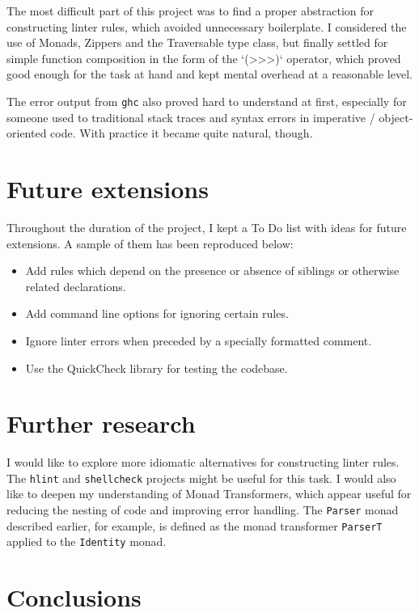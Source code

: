 \documentclass[]{article}
\providecommand{\tightlist}{%
  \setlength{\itemsep}{0pt}\setlength{\parskip}{0pt}}
\begin{document}
The most difficult part of this project was to find a proper abstraction
for constructing linter rules, which avoided unnecessary boilerplate. I
considered the use of Monads, Zippers and the Traversable type
class, but finally settled for simple function composition in the form
of the `(>>>)` operator, which proved good enough for the task
at hand and kept mental overhead at a reasonable level.

The error output from \texttt{ghc} also proved hard to understand at
first, especially for someone used to traditional stack traces and
syntax errors in imperative / object-oriented code. With practice it
became quite natural, though.

\section{Future extensions}\label{future-extensions}

Throughout the duration of the project, I kept a To Do list with ideas
for future extensions. A sample of them has been reproduced below:

\begin{itemize}
\tightlist
\item
  Add rules which depend on the presence or absence of siblings or
  otherwise related declarations.
\item
  Add command line options for ignoring certain rules.
\item
  Ignore linter errors when preceded by a specially formatted comment.
\item
  Use the QuickCheck library for testing the codebase.
\end{itemize}

\section{Further research}\label{further-research}

I would like to explore more idiomatic alternatives for constructing
linter rules. The \texttt{hlint} and \texttt{shellcheck} projects might
be useful for this task. I would also like to deepen my understanding of
Monad Transformers, which appear useful for reducing the nesting of code
and improving error handling. The \texttt{Parser} monad described earlier,
for example, is defined as the monad transformer \texttt{ParserT} applied
to the \texttt{Identity} monad.

\section{Conclusions}\label{conclusions}
\end{document}
